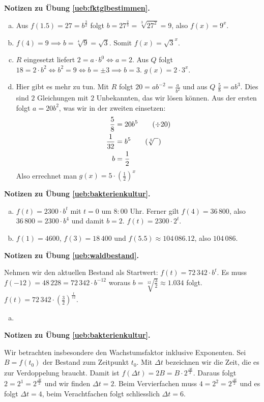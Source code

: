 \documentclass[%
11pt,%
twoside,%
titlepage,%
german,%
headsepline%
]{scrartcl}
\newcommand{\concatueb}[1]{ueb:#1}%
\newcommand{\concatlsg}[1]{lsg:#1}%
\newenvironment{lsg}[1]{%
    \par\noindent\textbf{Notizen zu Übung \ref{\concatueb{#1}}.}%
    \label{\concatlsg{#1}}
}{%
    \par%
}
\begin{document}
\begin{lsg}{fktglbestimmen}
    \begin{enumerate}[a)]
        \item Aus $f(1.5)=27=b^\frac{3}{2}$ folgt $b=27^\frac{2}{3}=\sqrt[3]{27^2}=9$, also $f(x)=9^x$.
        \item $f(4)=9\implies b=\sqrt[4]{9}=\sqrt{3}$. Somit $f(x)=\sqrt{3}^x$.
        \item $R$ eingesetzt liefert $2=a\cdot b^0\Leftrightarrow a=2$. Aus $Q$ folgt $18=2\cdot b^2\Leftrightarrow b^2=9\Leftrightarrow b=\pm3\implies b=3$. $g(x)=2\cdot3^x$.
        \item Hier gibt es mehr zu tun. Mit $R$ folgt $20=ab^{-2}=\frac{a}{b^2}$ und aus $Q$ $\frac{5}{8}=ab^3$. Dies sind $2$ Gleichungen mit $2$  Unbekannten, das wir lösen können. Aus der ersten folgt $a=20b^2$, was wir in der zweiten einsetzen:
        \begin{align*}
            \frac{5}{8} &= 20b^5\tag{$\div20$}\\
            \frac{1}{32} &= b^5\tag{$\sqrt[5]{\phantom{x}}$}\\
            b &= \frac{1}{2}
        \end{align*}
        Also errechnet man $g(x)=5\cdot\left(\frac{1}{2}\right)^x$
    \end{enumerate}
\end{lsg}
\begin{lsg}{bakterienkultur}
    \begin{enumerate}[a)]
        \item $f(t)=2300\cdot b^t$ mit $t=0$ um $8:00$ Uhr. Ferner gilt $f(4)=36\,800$, also $36\,800=2300\cdot b^4$ und damit $b=2$. $f(t)=2300\cdot2^t$.
        \item $f(1)=4600$, $f(3)=18\,400$ und $f(5.5)\approx104\,086.12$, also $104\,086$.
    \end{enumerate}
\end{lsg}
\begin{lsg}{waldbestand}
    Nehmen wir den aktuellen Bestand als Startwert: $f(t)=72\,342\cdot b^t$. Es muss $f(-12)=48\,228=72\,342\cdot b^{-12}$ woraus $b=\sqrt[12]{\frac{3}{2}}\approx1.034$ folgt. $f(t)=72\,342\cdot\left(\frac{3}{2}\right)^{\frac{t}{12}}$.
    \begin{enumerate}[a)]
        \item 
    \end{enumerate}
\end{lsg}
\begin{lsg}{bakterienkultur}
    Wir betrachten insbesondere den Wachstumsfaktor inklusive Exponenten. Sei $B=f(t_0)$ der Bestand zum Zeitpunkt $t_0$. Mit $\Delta t$ bezeichnen wir die Zeit, die es zur Verdoppelung braucht. Damit ist $f(\Delta t)=2B=B\cdot2^\frac{\Delta t}{2}$. Daraus folgt $2=2^1=2^\frac{\Delta t}{2}$ und wir finden $\Delta t=2$. Beim Vervierfachen muss $4=2^2=2^\frac{\Delta t}{2}$ und es folgt $\Delta t=4$, beim Verachtfachen folgt schliesslich $\Delta t=6$.
\end{lsg}
\end{document}
